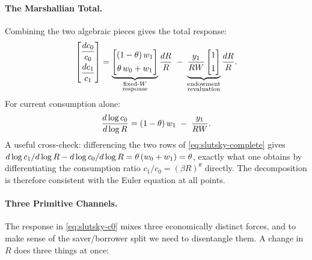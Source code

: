 \paragraph{The Marshallian Total.}
Combining the two algebraic pieces gives the total response:
\begin{equation}
\;\begin{bmatrix} \dfrac{dc_0}{c_0} \\[8pt] \dfrac{dc_1}{c_1} \end{bmatrix} = \underbrace{\begin{bmatrix} (1-\theta) \, w_1 \\[4pt] \theta \, w_0 + w_1 \end{bmatrix}}_{\substack{\text{fixed-$W$}\\\text{response}}} \frac{dR}{R} \;-\; \underbrace{\frac{y_1}{RW} \begin{bmatrix} 1 \\[4pt] 1 \end{bmatrix}}_{\substack{\text{endowment}\\\text{revaluation}}} \frac{dR}{R}.\;
\label{eq:slutsky-complete}
\end{equation}
For current consumption alone:
\begin{equation}
\frac{d\log c_0}{d\log R} = (1-\theta)\,w_1 \;-\; \frac{y_1}{RW}.
\label{eq:slutsky-c0}
\end{equation}
A useful cross-check: differencing the two rows of \cref{eq:slutsky-complete} gives $d\log c_1/d\log R - d\log c_0/d\log R = \theta\,(w_0 + w_1) = \theta$, exactly what one obtains by differentiating the consumption ratio $c_1/c_0 = (\beta R)^\theta$ directly. The decomposition is therefore consistent with the Euler equation at all points.

\paragraph{Three Primitive Channels.}
The response in \cref{eq:slutsky-c0} mixes three economically distinct forces, and to make sense of the saver/borrower split we need to disentangle them. A change in $R$ does three things at once:

